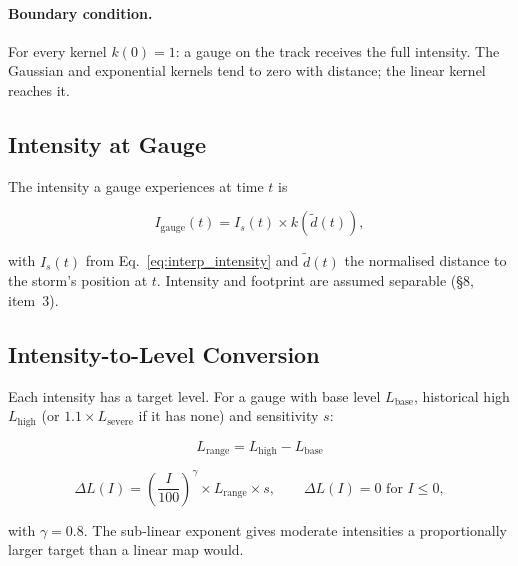 \documentclass[11pt,a4paper]{article}
\begin{document}
\paragraph{Boundary condition.} For every kernel $k(0) = 1$: a gauge on the track
receives the full intensity. The Gaussian and exponential kernels tend to zero with
distance; the linear kernel reaches it.

\subsection{Intensity at Gauge}
\label{sec:intensity_at_gauge}

The intensity a gauge experiences at time $t$ is

\begin{equation}
    I_{\text{gauge}}(t) = I_s(t) \times k\!\left(\tilde{d}(t)\right),
    \label{eq:intensity_at_gauge}
\end{equation}

\noindent with $I_s(t)$ from Eq.~\ref{eq:interp_intensity} and $\tilde{d}(t)$ the
normalised distance to the storm's position at $t$. Intensity and footprint are assumed
separable (\S8, item~3).

\subsection{Intensity-to-Level Conversion}
\label{sec:intensity_to_level}

Each intensity has a target level. For a gauge with base level $L_{\text{base}}$,
historical high $L_{\text{high}}$ (or $1.1 \times L_{\text{severe}}$ if it has none) and
sensitivity $s$:

\begin{equation}
    L_{\text{range}} = L_{\text{high}} - L_{\text{base}}
    \label{eq:level_range}
\end{equation}

\begin{equation}
    \Delta L(I) = \left(\frac{I}{100}\right)^{\!\gamma} \times L_{\text{range}} \times s,
    \qquad \Delta L(I) = 0 \text{ for } I \le 0,
    \label{eq:power_law}
\end{equation}

\noindent with $\gamma = 0.8$. The sub-linear exponent gives moderate intensities a
proportionally larger target than a linear map would.
\end{document}
